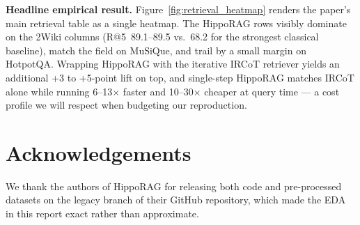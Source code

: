 \documentclass{article}
\begin{document}
\textbf{Headline empirical result.} Figure~\ref{fig:retrieval_heatmap} renders the paper's main retrieval table as a single heatmap. The HippoRAG rows visibly dominate on the 2Wiki columns (R@5~89.1--89.5 vs.\ 68.2 for the strongest classical baseline), match the field on MuSiQue, and trail by a small margin on HotpotQA. Wrapping HippoRAG with the iterative IRCoT retriever yields an additional +3 to +5-point lift on top, and single-step HippoRAG matches IRCoT alone while running 6--13$\times$ faster and 10--30$\times$ cheaper at query time --- a cost profile we will respect when budgeting our reproduction.


\section*{Acknowledgements}
We thank the authors of HippoRAG for releasing both code and pre-processed datasets on the legacy branch of their GitHub repository, which made the EDA in this report exact rather than approximate.
\end{document}
